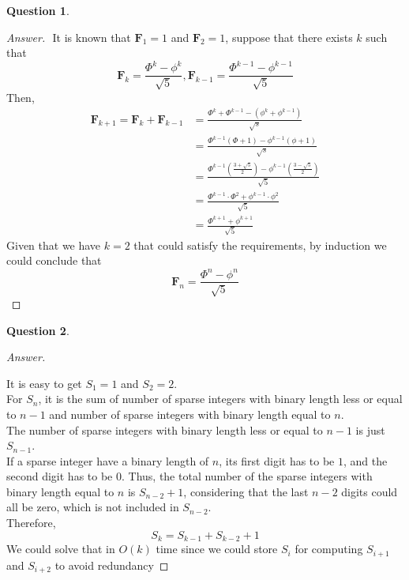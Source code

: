 \documentclass{article}
\theoremstyle{plain}
\newtheorem{question}{Question}
\newenvironment{answer}[1][Answer]
    {\begin{proof}[#1]{$ $}\renewcommand\qedsymbol{$\vartriangle$}}
    {\end{proof}}
\begin{document}
\begin{question}
\end{question}
\begin{answer}
    It is known that $\mathbf{F}_1 = 1$ and $\mathbf{F}_2 = 1$, suppose that there exists $k$ such that
    \begin{equation*}
    \mathbf{F}_{k}=\frac{\Phi^{k}-\phi^{k}}{\sqrt{5}}, \mathbf{F}_{k-1}=\frac{\Phi^{k-1}-\phi^{k-1}}{\sqrt{5}}
    \end{equation*}
    Then,
    \begin{equation*}
    \begin{aligned}
    \mathbf{F}_{k+1}=\mathbf{F}_{k}+\mathbf{F}_{k-1} &=\frac{\Phi^{k}+\Phi^{k-1}-\left(\phi^{k}+\phi^{k-1}\right)}{\sqrt{s}} \\
    &=\frac{\Phi^{k-1}(\Phi+1)-\phi^{k-1}(\phi+1)}{\sqrt{s}} \\
    &=\frac{\Phi^{k-1}\left(\frac{3+\sqrt{5}}{2}\right)-\phi^{k-1}\left(\frac{3-\sqrt{5}}{2}\right)}{\sqrt{5}} \\
    &=\frac{\Phi^{k-1} \cdot \Phi^{2}+\phi^{k-1} \cdot \phi^{2}}{\sqrt{5}} \\
    &=\frac{\Phi^{k+1}+\phi^{k+1}}{\sqrt{5}}
    \end{aligned}
    \end{equation*}
    Given that we have $k = 2$ that could satisfy the requirements, by induction we could conclude that
    \begin{equation*}
        \mathbf{F}_{n}=\frac{\Phi^{n}-\phi^{n}}{\sqrt{5}}
    \end{equation*}
\end{answer}

\begin{question}
\end{question}
\begin{answer}

    It is easy to get $S_1 = 1$ and $S_2 = 2$. \\
    For $S_n$, it is the sum of number of sparse integers with binary length less or equal to $n - 1$ and number of sparse integers with binary length equal to $n$. \\
    The number of sparse integers with binary length less or equal to $n - 1$ is just $S_{n-1}$. \\
    If a sparse integer have a binary length of $n$, its first digit has to be $1$, and the second digit has to be $0$. Thus, the total number of the sparse integers with binary length equal to $n$ is $S_{n-2} + 1$, considering that the last $n-2$ digits could all be zero, which is not included in $S_{n-2}$. \\
    Therefore,
    \begin{equation*}
    S_{k}=S_{k-1}+S_{k-2}+1
    \end{equation*}
    We could solve that in $O(k)$ time since we could store $S_i$ for computing $S_{i+1}$ and $S_{i+2}$ to avoid redundancy

\end{answer}
\end{document}
